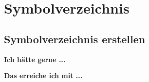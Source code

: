 \documentclass[twoside, 
               a4paper, 
               10pt, 
               parskip=full, 
               sectionentrydots=true, 
               listof=totoc, 
               listof=entryprefix,
               numbers=endperiod]{scrartcl}
\begin{document}

\newpage
\section{Symbolverzeichnis}
\subsection{Symbolverzeichnis erstellen}
{\textbf {Ich hätte gerne ...}}

\begin{miniSeite}[colbacktitle=black!35!white,title=Ausdruck]

\end{miniSeite} 

\newpage
{\textbf {Das erreiche ich mit ...}}
 
\begin{miniSeite}[colbacktitle=black!35!white,title=\LaTeX-Code]

\end{miniSeite}





\newpage
\thispagestyle{empty}
\mbox{}

\newpage
{}
\renewcommand{\indexname}{Stichwortverzeichnis \bigskip} 
   \label{index}
\printindex




\newpage
\thispagestyle{empty}
\mbox{}

\newpage
\listoffigures
\label{abbildungen}




\newpage
\thispagestyle{empty}
\mbox{}

\newpage
\listoftables
\label{tabellen}
\end{document}

